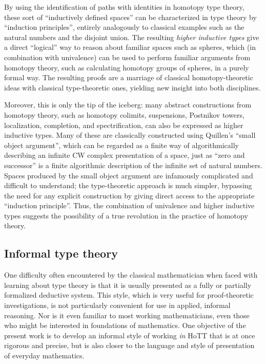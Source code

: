 {By using the identification of paths with identities in homotopy type theory, these sort of ``inductively defined spaces'' can be characterized in type theory by ``induction principles'', entirely analogously to classical examples such as the natural numbers and the disjoint union.
The resulting \emph{higher inductive types} give a direct ``logical'' way to reason about familiar spaces such as spheres, which (in combination with univalence) can be used to perform familiar arguments from homotopy theory, such as calculating homotopy groups of spheres, in a purely formal way.
The resulting proofs are a marriage of classical homotopy-theoretic ideas with classical type-theoretic ones, yielding new insight into both disciplines.

Moreover, this is only the tip of the iceberg: many abstract constructions from homotopy theory, such as homotopy colimits, suspensions, Postnikov towers, localization, completion, and spectrification, can also be expressed as higher inductive types.
Many of these are classically constructed using Quillen's ``small object argument'', which can be regarded as a finite way of algorithmically describing an infinite CW complex presentation of a space, just as ``zero and successor'' is a finite algorithmic description of the infinite set of natural numbers.
Spaces produced by the small object argument are infamously complicated and difficult to understand; the type-theoretic approach is much simpler, bypassing the need for any explicit construction by giving direct access to the appropriate ``induction principle''.
Thus, the combination of univalence and higher inductive types suggests the possibility of a true revolution in the practice of homotopy theory.


\subsection*{Informal type theory}

One difficulty often encountered by the classical mathematician when faced with learning about type theory is that it is usually presented as a fully or partially formalized deductive system.
This style, which is very useful for proof-theoretic investigations, is not particularly convenient for use in applied, informal reasoning.
Nor is it even familiar to most working mathematicians, even those who might be interested in foundations of mathematics.
One objective of the present work is to develop an informal style of working \emph{in} HoTT that is at once rigorous and precise, but is also closer to the language and style of presentation of everyday mathematics.

}
